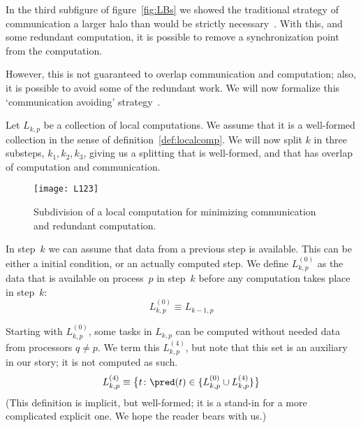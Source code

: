 
\label{sec:avoid-framework}

In the third subfigure of figure~\ref{fig:LBs} we showed the
traditional strategy of communication a larger halo than would be
strictly
necessary~\cite{Douglas:caching-multigrid,Eijkhout:poly-smooth,OpJo:improved-ssor}.
With this, and some redundant computation, it is possible to remove a
synchronization point from the computation.

However, this is not guaranteed to overlap communication and
computation; also, it is possible to avoid some of the redundant work.
We will now formalize this `communication avoiding'
strategy~\cite{Demmel2008IEEE:avoiding}.

Let $L_{k,p}$ be a collection of local computations. We assume that it
is a well-formed collection in the sense of
definition~\ref{def:localcomp}. We will now split $k$ in three
substeps, $k_1,k_2,k_3$, giving us a splitting that is well-formed,
and that has overlap of computation and communication.

\begin{figure}[ht]
  \texttt{[image: L123]}
  \caption{Subdivision of a local computation for minimizing communication and redundant computation.}
  \label{fig:avoid}
\end{figure}


In step~$k$ we can assume that data from a previous step is
available. This can be either a initial condition, or an actually
computed step. We define $L^{(0)}_{k,p}$ as the data that is available
on process~$p$ in step~$k$ before any computation takes place in step~$k$:
\[
    L^{(0)}_{k,p} \equiv L_{k-1,p}
\]


Starting with $L^{(0)}_{k,p}$, some tasks in $L_{k,p}$ can be computed without
needed data from processors $q\not=p$. We term this $L^{(4)}_{k,p}$,
but note that this set is an auxiliary in our story; it is not
computed as such.
\[
    L^{(4)}_{k,p} \equiv
    \bigl\{ t\colon \pred(t)\in \{ L^{(0)}_{k,p} \cup L^{(4)}_{k,p} \} 
    \bigr\}
\]
(This definition is implicit, but well-formed; it is a stand-in for a
more complicated explicit one. We hope the reader bears with us.)

